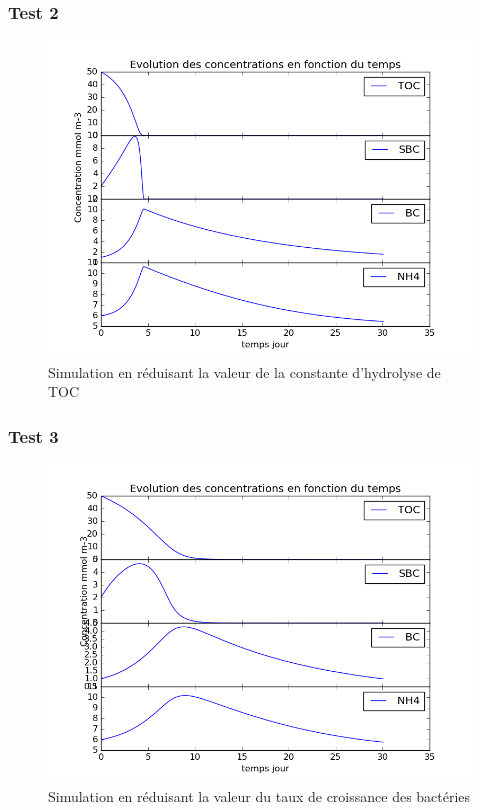 \subsubsection{Test 2}

\begin{figure}[h!]
  \includegraphics[width=\textwidth]{partie1/Test2.png}
  \caption{Simulation en r\'eduisant la valeur de la constante d'hydrolyse de TOC
  }
  \label{fig:partie1test2}
\end{figure}

\subsubsection{Test 3}

\begin{figure}[h!]
  \includegraphics[width=\textwidth]{partie1/Test3.png}
  \caption{Simulation en r\'eduisant la valeur du taux de croissance des bact\'eries
  }
  \label{fig:partie1test3}
\end{figure}

